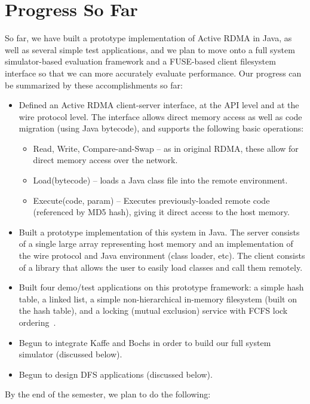 \documentclass[10pt]{article}
\begin{document}
\section{Progress So Far}

So far, we have built a prototype implementation of Active RDMA in
Java, as well as several simple test applications, and we plan to move
onto a full system simulator-based evaluation framework and a
FUSE-based client filesystem interface so that we can more accurately
evaluate performance. Our progress can be summarized by
these accomplishments so far:

\begin{itemize}
\item Defined an Active RDMA client-server interface, at the API level
  and at the wire protocol level. The interface allows direct memory
  access as well as code migration (using Java bytecode), and supports
  the following basic operations:
  \begin{itemize}
  \item Read, Write, Compare-and-Swap -- as in original RDMA, these
    allow for direct memory access over the network.
  \item Load(bytecode) -- loads a Java class file into the remote
    environment.
  \item Execute(code, param) -- Executes previously-loaded remote code
    (referenced by MD5 hash), giving it direct access to the host
    memory.
  \end{itemize}
\item Built a prototype implementation of this system in Java. The
  server consists of a single large array representing host memory and
  an implementation of the wire protocol and Java environment (class
  loader, etc). The client consists of a library that allows the user
  to easily load classes and call them remotely.
\item Built four demo/test applications on this prototype framework: a
  simple hash table, a linked list, a simple non-hierarchical
  in-memory filesystem (built on the hash table), and a locking
  (mutual exclusion) service with FCFS lock
  ordering~\cite{nic-basedatomic}.
\item Begun to integrate Kaffe and Bochs in order to build our full
  system simulator (discussed below).
  \item Begun to design DFS applications (discussed below).
\end{itemize}

By the end of the semester, we plan to do the following:
\end{document}
